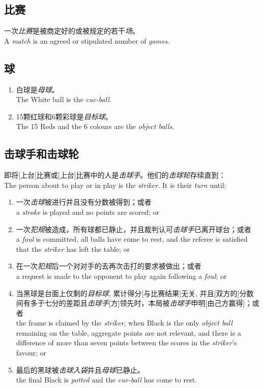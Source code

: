 \subsection{比赛}

\noindent 一次\textit{比赛}是被商定好的或被规定的若干\textit{场}。\\
A \textit{match} is an agreed or stipulated number of \textit{games}.

\subsection{球}

\begin{enumerate}[label=(\alph*)]
    \item 白球是\textit{母球}。\\
    The White ball is the \textit{cue-ball}.
    \item 15颗红球和6颗彩球是\textit{目标球}。\\
    The 15 Reds and the 6 colours are the \textit{object balls}.
\end{enumerate}

\subsection{击球手和击球轮}

\noindent 即将[上台]比赛或[上台]比赛中的人是\textit{击球手}。他们的\textit{击球轮}存续直到：\\
The person about to play or in play is the \textit{striker}. It is their \textit{turn} until:
\begin{enumerate}[label=(\alph*)]
    \item 一次\textit{击球}被进行并且没有分数被得到；或者\\
    a \textit{stroke} is played and no points are scored; or
    \item 一次\textit{犯规}被造成，所有球都已静止，并且裁判认可\textit{击球手}已离开球台；或者\\
    a \textit{foul} is committed, all balls have come to rest, and the referee is satisfied that the \textit{striker} has left the table; or
    \item 在一次\textit{犯规}后一个对对手的去再次击打的要求被做出；或者\\
    a request is made to the opponent to play again following a \textit{foul}; or
    \item 当黑球是台面上仅剩的\textit{目标球}, 累计得分[与比赛结果]无关, 并且[双方的]分数间有多于七分的差距且\textit{击球手}[方]领先时，本局被\textit{击球手}申明[由己方赢得]；或者\\
    the frame is claimed by the \textit{striker}, when Black is the only \textit{object ball} remaining on the table, aggregate points are not relevant, and there is a difference of more than seven points between the scores in the \textit{striker}'s favour; or
    \item 最后的黑球被\textit{击球入袋}并且\textit{母球}已静止。\\
    the final Black is \textit{potted} and the \textit{cue-ball} has come to rest.
\end{enumerate}

